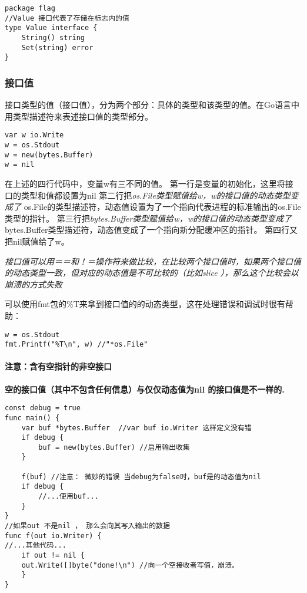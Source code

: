 \begin{verbatim}
package flag
//Value 接口代表了存储在标志内的值
type Value interface {
    String() string
    Set(string) error
}
\end{verbatim}

\hypertarget{ux63a5ux53e3ux503c}{%
\subsubsection{接口值}\label{ux63a5ux53e3ux503c}}

接口类型的值（接口值），分为两个部分：具体的类型和该类型的值。在Go语言中用类型描述符来表述接口值的类型部分。

\begin{verbatim}
var w io.Write  
w = os.Stdout   
w = new(bytes.Buffer)
w = nil
\end{verbatim}

在上述的四行代码中，变量w有三不同的值。
第一行是变量的初始化，这里将接口的类型和值都设置为nil
第二行把\emph{os.File类型赋值给w，w的接口值的动态类型变成了
}os.File的类型描述符，动态值设置为了一个指向代表进程的标准输出的os.File
类型的指针。
第三行把\emph{bytes.Buffer类型赋值给w，w的接口值的动态类型变成了
}bytes.Buffer类型描述符，动态值变成了一个指向新分配缓冲区的指针。
第四行又把nil赋值给了w。

\emph{接口值可以用＝＝和！＝操作符来做比较，在比较两个接口值时，如果两个接口值的动态类型一致，但对应的动态值是不可比较的（比如slice
），那么这个比较会以崩溃的方式失败}

可以使用fmt包的\%T来拿到接口值的的动态类型，这在处理错误和调试时很有帮助：

\begin{verbatim}
w = os.Stdout
fmt.Printf("%T\n", w) //"*os.File"
\end{verbatim}

\hypertarget{ux6ce8ux610fux542bux6709ux7a7aux6307ux9488ux7684ux975eux7a7aux63a5ux53e3}{%
\paragraph{注意：含有空指针的非空接口}\label{ux6ce8ux610fux542bux6709ux7a7aux6307ux9488ux7684ux975eux7a7aux63a5ux53e3}}

\textbf{空的接口值（其中不包含任何信息）与仅仅动态值为nil
的接口值是不一样的.}

\begin{verbatim}
const debug = true
func main() {
    var buf *bytes.Buffer  //var buf io.Writer 这样定义没有错
    if debug {
        buf = new(bytes.Buffer) //启用输出收集
    }
    
    f(buf) //注意： 微妙的错误 当debug为false时，buf是的动态值为nil
    if debug {
        //...使用buf...
    }
}
//如果out 不是nil ， 那么会向其写入输出的数据
func f(out io.Writer) {
//...其他代码...
    if out != nil {
    out.Write([]byte("done!\n") //向一个空接收者写值，崩溃。
    }
}
\end{verbatim}

